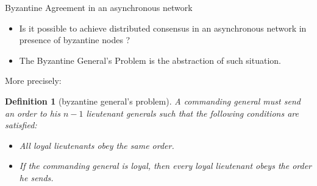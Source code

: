 \documentclass[usenames,dvipsnames]{beamer}
\newtheorem{mydef}{\alert{Definition}}[section]
\begin{document}
    \begin{frame}{Byzantine Agreement in an asynchronous network}
           \begin{itemize}
               \item Is it possible to achieve \alert{distributed consensus} in an \alert{asynchronous} network in presence of \alert{byzantine} nodes ?
               \item The \alert{Byzantine General's Problem} is the abstraction of such situation.
           \end{itemize}
           More precisely:
           \begin{mydef}[byzantine general's problem]
            A commanding general must send an order to his $n-1$ lieutenant generals such that the following conditions are satisfied:
            \begin{itemize}
                \item All loyal lieutenants obey the same order.
                \item If the commanding general is loyal, then every loyal lieutenant obeys the order he sends.
            \end{itemize}
           \end{mydef}
	        
    \end{frame}
        
\end{document}
